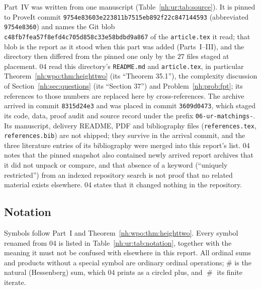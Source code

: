 \documentclass[11pt,a4paper]{article}
\theoremstyle{definition}
\theoremstyle{remark}
\newcommand{\ns}{\mathbin{\#}}
\newcommand{\bigns}{\mathop{\#}\limits}
\begin{document}
Part~IV was written from one manuscript (Table~\ref{nh:ur:tab:source}).
It is pinned to ProveIt commit
\texttt{9754e83603e223811b7515eb892f22c847144593} (abbreviated
\texttt{9754e8360}) and names the Git blob
\texttt{c48fb7fea57f8efd4c705d858c33e58bdbd9a867} of the \texttt{article.tex}
it read; that blob is the report as it stood when this part was added
(Parts~I--III), and the directory then differed from the pinned one only by
the $27$ files staged at placement. 04 read this directory's \texttt{README.md} and
\texttt{article.tex}, in particular Theorem~\ref{nh:wpo:thm:heighttwo}
(its ``Theorem 35.1''), the complexity discussion of
Section~\ref{nh:sec:questions} (its ``Section 37'') and
Problem~\ref{nh:prob:fpt}; its references to those numbers are replaced here
by cross-references. The archive arrived in commit \texttt{8315d24e3} and
was placed in commit \texttt{3609d0473}, which staged its code, data, proof
audit and source record under the prefix \texttt{06-ur-matchings-}. Its
manuscript, delivery README, PDF and bibliography files
(\texttt{references.tex}, \texttt{references.bib}) are not shipped; they
survive in the arrival commit, and the three literature entries of its
bibliography were merged into this report's list. 04 notes that the pinned
snapshot also contained newly arrived report archives that it did not unpack
or compare, and that absence of a keyword (``uniquely restricted'') from an
indexed repository search is not proof that no related material exists
elsewhere. 04 states that it changed nothing in the repository.

\subsection{Notation}\label{nh:ur:sec:notation}

Symbols follow Part~I and Theorem~\ref{nh:wpo:thm:heighttwo}. Every symbol
renamed from 04 is listed in Table~\ref{nh:ur:tab:notation}, together with
the meaning it must not be confused with elsewhere in this report. All
ordinal sums and products without a special symbol are ordinary ordinal
operations; $\ns$ is the natural (Hessenberg) sum, which 04 prints as a
circled plus, and $\bigns$ its finite iterate.
\end{document}
